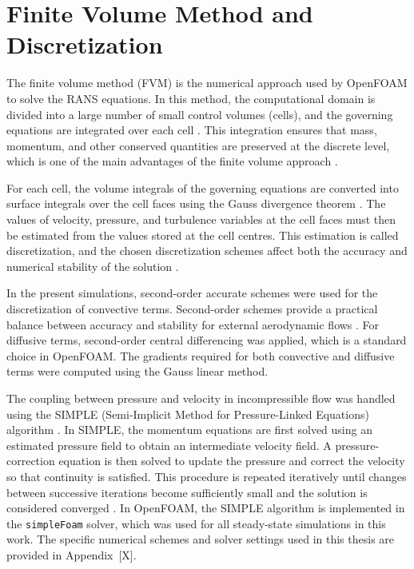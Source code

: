 \section{Finite Volume Method and Discretization}

\label{sec:fvm_discretization}

The finite volume method (FVM) is the numerical approach used by OpenFOAM to solve the RANS equations. In this method, the computational domain is divided into a large number of small control volumes (cells), and the governing equations are integrated over each cell \cite{Patankar1980NumericalHeatTransfer,VersteegMalalasekera2007CFD}. This integration ensures that mass, momentum, and other conserved quantities are preserved at the discrete level, which is one of the main advantages of the finite volume approach \cite{VersteegMalalasekera2007CFD,FerzigerPericStreet2019CMFD}.

For each cell, the volume integrals of the governing equations are converted into surface integrals over the cell faces using the Gauss divergence theorem \cite{VersteegMalalasekera2007CFD}. The values of velocity, pressure, and turbulence variables at the cell faces must then be estimated from the values stored at the cell centres. This estimation is called discretization, and the chosen discretization schemes affect both the accuracy and numerical stability of the solution \cite{Patankar1980NumericalHeatTransfer,VersteegMalalasekera2007CFD}.

In the present simulations, second-order accurate schemes were used for the discretization of convective terms. Second-order schemes provide a practical balance between accuracy and stability for external aerodynamic flows \cite{VersteegMalalasekera2007CFD,FerzigerPericStreet2019CMFD}. For diffusive terms, second-order central differencing was applied, which is a standard choice in OpenFOAM. The gradients required for both convective and diffusive terms were computed using the Gauss linear method.

The coupling between pressure and velocity in incompressible flow was handled using the SIMPLE (Semi-Implicit Method for Pressure-Linked Equations) algorithm \cite{Patankar1980NumericalHeatTransfer,VersteegMalalasekera2007CFD}. In SIMPLE, the momentum equations are first solved using an estimated pressure field to obtain an intermediate velocity field. A pressure-correction equation is then solved to update the pressure and correct the velocity so that continuity is satisfied. This procedure is repeated iteratively until changes between successive iterations become sufficiently small and the solution is considered converged \cite{Patankar1980NumericalHeatTransfer,VersteegMalalasekera2007CFD}. In OpenFOAM, the SIMPLE algorithm is implemented in the \texttt{simpleFoam} solver, which was used for all steady-state simulations in this work. The specific numerical schemes and solver settings used in this thesis are provided in Appendix~[X].
